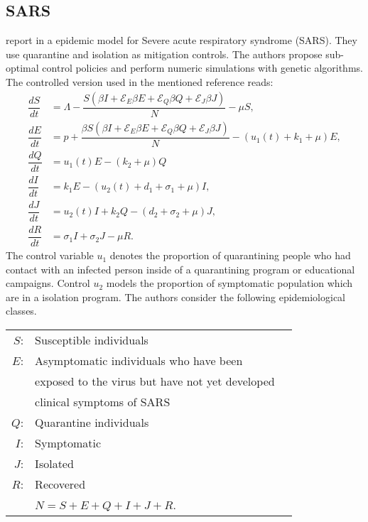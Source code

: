 
\subsection{SARS}
\citeauthor{Yan2008} report in \cite{Yan2008} a epidemic model for
Severe acute respiratory syndrome (SARS). They use quarantine and 
isolation as mitigation controls. The authors propose sub-optimal 
control policies and perform numeric simulations with genetic 
algorithms. The controlled version used in the mentioned 
reference reads:
%
%
\begin{equation}\label{eqn:sars_model}
	\begin{aligned}
		\dfrac{dS}{dt} &=
			\Lambda 
			-\dfrac{
				S
				\left(
					\beta I 
					+ \mathcal{E}_E  \beta E
					+ \mathcal{E}_Q  \beta Q
					+ \mathcal{E}_J  \beta J
				\right)
			}{N}
			- \mu S,
		\\
		\dfrac{dE}{dt} &=
			p +
			\dfrac{
				\beta S
				\left(
					\beta I 
						+ \mathcal{E}_E \beta E
						+ \mathcal{E}_Q \beta Q
						+ \mathcal{E}_J \beta J
				\right)
			}{N}
			-(
				u_1(t) + k_1 + \mu
			)E,
		\\
		\dfrac{dQ}{dt} &=
			u_1(t) E 
			- (k_2 + \mu) Q
		\\
		\dfrac{dI}{dt} &=
			k_1 E 
			-(u_2(t) + d_1  + \sigma_1 + \mu) I,
		\\
		\dfrac{dJ}{dt} &=
			u_2(t) I 
			+ k_2 Q
			- (d_2 + \sigma_2 + \mu) J,
		\\
		\dfrac{dR}{dt} &=
			\sigma_1 I
			+\sigma_2 J
			- \mu R.
	\end{aligned}
\end{equation}
The control variable $u_1$ denotes the proportion of quarantining people 
who had contact with an infected person inside of a quarantining program or
educational campaigns. Control $u_2$ models the proportion of symptomatic 
population which are in a isolation program. The authors consider the 
following epidemiological classes.
\begin{table}[h!]
	\begin{center}
		\begin{tabular}{@{}rll@{}} 
			$S$: & Susceptible individuals 
			\\
			$E$: & Asymptomatic individuals who have been 
			\\
			   & exposed to the virus but have not yet developed 
			\\
			   & clinical symptoms of SARS 
			\\
			$Q$: & Quarantine individuals
			\\
			$I$: & Symptomatic 
			\\
			$J$: & Isolated
			\\
			$R$: & Recovered
			\\
				& $N = S + E + Q + I + J + R$.
		\end{tabular}
	\end{center}
\end{table}
